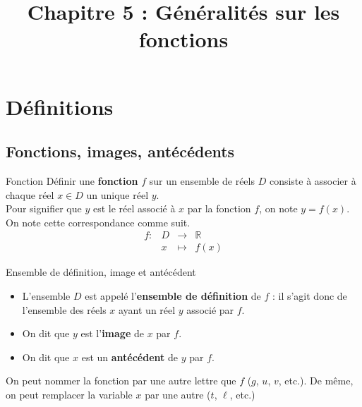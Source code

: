 \documentclass[11pt]{article}
\title{Chapitre 5 : Généralités sur les fonctions}
\date{}
\author{}
\begin{document}
\maketitle\thispagestyle{fancy}

%

\section{Définitions}
\subsection{Fonctions, images, antécédents}
\begin{defi}{Fonction}
  Définir une \textbf{fonction} $f$ sur un ensemble de réels $D$ consiste à
  associer à chaque réel $x\in D$ un unique réel $y$.\\
  Pour signifier que $y$ est le réel associé à $x$ par la fonction $f$, on note
  $y=f(x)$. On note cette correspondance comme suit.
  \[
    \begin{array}{cccc}
      f: & D & \to & \mathbb{R} \\
   & x & \mapsto & f(x)
 \end{array}
 \]
\end{defi}
\begin{defi}{Ensemble de définition, image et antécédent}
  \begin{itemize}
    \item L'ensemble $D$ est appelé l'\textbf{ensemble de définition} de $f$ : il s'agit
      donc de l'ensemble des réels $x$ ayant un réel $y$ associé par $f$.
    \item On dit que $y$ est l'\textbf{image} de $x$ par $f$.
    \item On dit que $x$ est un \textbf{antécédent} de $y$ par $f$.
  \end{itemize}
\end{defi}
\begin{rmq}
  On peut nommer la fonction par une autre lettre que $f$ ($g$, $u$, $v$, etc.). De même, on peut
  remplacer la variable $x$ par une autre ($t$, $\ell$, etc.)
\end{rmq}
\end{document}
